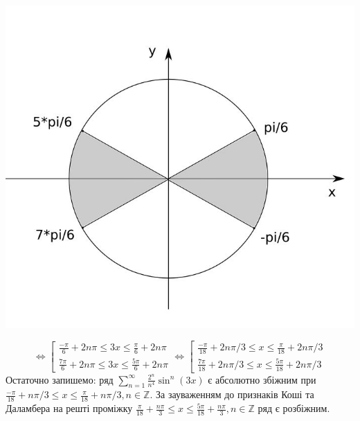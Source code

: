 \documentclass[14pt,a4paper]{scrartcl}
\theoremstyle{definition}
\theoremstyle{remark}
\theoremstyle{definition}
\theoremstyle{definition}
\begin{document}
\begin{center}
\includegraphics[scale=0.4]{im1}
\end{center}
$$
\Leftrightarrow \left[ \begin{gathered}
     \frac{-\pi}{6} + 2n\pi \leq 3x \leq \frac{\pi}{6} + 2n\pi\\
      \frac{7\pi}{6} + 2n\pi \leq 3x \leq \frac{5\pi}{6} + 2n\pi
\end{gathered} \right.
\Leftrightarrow \left[ \begin{gathered}
     \frac{-\pi}{18} + 2n\pi/3 \leq x \leq \frac{\pi}{18} + 2n\pi/3\\
      \frac{7\pi}{18} + 2n\pi/3 \leq x \leq \frac{5\pi}{18} + 2n\pi/3
\end{gathered} \right.
$$
Остаточно запишемо: ряд $\sum\limits_{n = 1}^{ \infty}{ \frac{2^n}{n^4} \sin^n{(3x)}  }$ є абсолютно збіжним при\\ $\frac{-\pi}{18} + n\pi/3 \leq x \leq \frac{\pi}{18} + n\pi/3, n\in \mathbb{Z}$. За зауваженням до признаків Коші та Даламбера на решті проміжку $ \frac{\pi}{18} + \frac{n\pi}{3} \leq x \leq \frac{5\pi}{18} + \frac{n\pi}{3}, n\in \mathbb{Z}    $ ряд є розбіжним.
\end{document}
